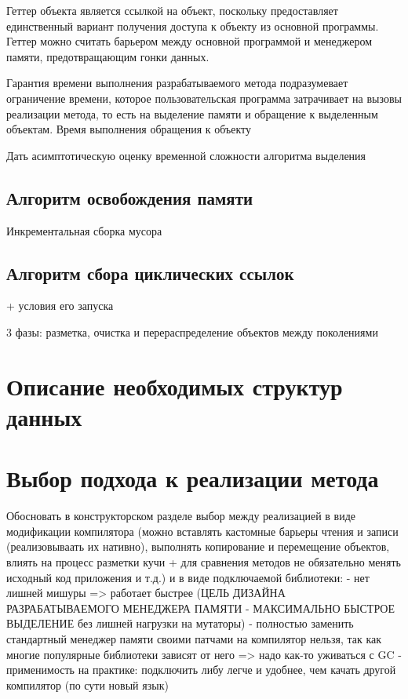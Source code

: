 Геттер объекта является ссылкой на объект, поскольку предоставляет единственный вариант получения доступа к объекту из основной программы. Геттер можно считать барьером между основной программой и менеджером памяти, предотвращающим гонки данных.

Гарантия времени выполнения разрабатываемого метода подразумевает ограничение времени, которое пользовательская программа затрачивает на вызовы реализации метода, то есть на выделение памяти и обращение к выделенным объектам. Время выполнения обращения к объекту 

Дать асимптотическую оценку временной сложности алгоритма выделения

\subsection{Алгоритм освобождения памяти}

Инкрементальная сборка мусора

\subsection{Алгоритм сбора циклических ссылок}

+ условия его запуска

3 фазы: разметка, очистка и перераспределение объектов между поколениями



\section{Описание необходимых структур данных}



\section{Выбор подхода к реализации метода}

Обосновать в конструкторском разделе выбор между реализацией в виде модификации компилятора (можно вставлять кастомные барьеры чтения и записи (реализовываать их нативно), выполнять копирование и перемещение объектов, влиять на процесс разметки кучи + для сравнения методов не обязательно менять исходный код приложения и т.д.) и в виде подключаемой библиотеки: 
- нет лишней мишуры => работает быстрее
(ЦЕЛЬ ДИЗАЙНА РАЗРАБАТЫВАЕМОГО МЕНЕДЖЕРА ПАМЯТИ - МАКСИМАЛЬНО БЫСТРОЕ ВЫДЕЛЕНИЕ без лишней нагрузки на мутаторы)
- полностью заменить стандартный менеджер памяти своими патчами на компилятор нельзя, так как многие популярные библиотеки зависят от него => надо как-то уживаться с GC
- применимость на практике: подключить либу легче и удобнее, чем качать другой компилятор (по сути новый язык)

